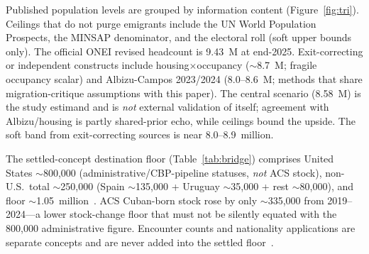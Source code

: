 \documentclass[11pt,a4paper]{article}
\begin{document}
Published population levels are grouped by information content (Figure~\ref{fig:tri}).
Ceilings that do not purge emigrants include the UN World Population Prospects, the MINSAP denominator, and the electoral roll (soft upper bounds only).
The official ONEI revised headcount is 9.43~M at end-2025.
Exit-correcting or independent constructs include housing$\times$occupancy ($\sim$8.7~M; fragile occupancy scalar) and Albizu-Campos 2023/2024 (8.0--8.6~M; methods that share migration-critique assumptions with this paper).
The central scenario (8.58~M) is the study estimand and is \emph{not} external validation of itself; agreement with Albizu/housing is partly shared-prior echo, while ceilings bound the upside.
The soft band from exit-correcting sources is near 8.0--8.9~million.

The settled-concept destination floor (Table~\ref{tab:bridge}) comprises United States $\sim$800{,}000 (administrative/CBP-pipeline statuses, \emph{not} ACS stock), non-U.S.\ total $\sim$250{,}000 (Spain $\sim$135{,}000 + Uruguay $\sim$35{,}000 + rest $\sim$80{,}000), and floor $\sim$1.05~million~\citep{destinations,pew_cuban}.
ACS Cuban-born stock rose by only $\sim$335{,}000 from 2019--2024---a lower stock-change floor that must not be silently equated with the 800{,}000 administrative figure.
Encounter counts and nationality applications are separate concepts and are never added into the settled floor~\citep{cbp_encounters}.
\end{document}
